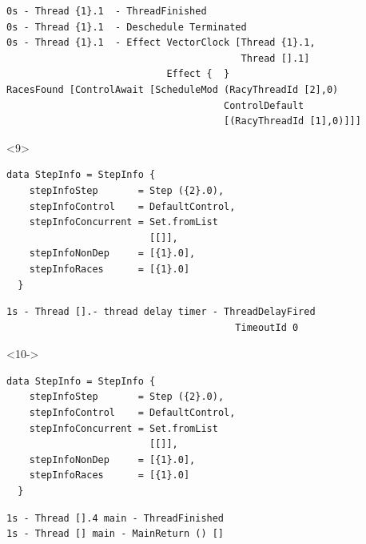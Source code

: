 \documentclass[t,x11names,xcolor={x11names},hyperref={colorlinks,citecolor=Blue4,linkcolor=Blue4,anchorcolor=Blue4,urlcolor=Blue4}]{beamer}
\begin{document}
\begin{frame}[fragile]
\begin{columns}
\begin{column}{0.6\textwidth}
\begin{onlyenv}
\begin{verbatim}
        \end{verbatim}
        \begin{verbatim}
0s - Thread {1}.1  - ThreadFinished
0s - Thread {1}.1  - Deschedule Terminated
0s - Thread {1}.1  - Effect VectorClock [Thread {1}.1,
                                         Thread [].1]
                            Effect {  }
RacesFound [ControlAwait [ScheduleMod (RacyThreadId [2],0)
                                      ControlDefault
                                      [(RacyThreadId [1],0)]]]
        \end{verbatim}
      \end{onlyenv}
      \begin{onlyenv}<9>
        \tiny
        \begin{verbatim}
data StepInfo = StepInfo {
    stepInfoStep       = Step ({2}.0),
    stepInfoControl    = DefaultControl,
    stepInfoConcurrent = Set.fromList
                         [[]],
    stepInfoNonDep     = [{1}.0],
    stepInfoRaces      = [{1}.0]
  }

        \end{verbatim}
        \begin{verbatim}
1s - Thread [].- thread delay timer - ThreadDelayFired
                                        TimeoutId 0
        \end{verbatim}
      \end{onlyenv}
      \begin{onlyenv}<10->
        \tiny
        \begin{verbatim}
data StepInfo = StepInfo {
    stepInfoStep       = Step ({2}.0),
    stepInfoControl    = DefaultControl,
    stepInfoConcurrent = Set.fromList
                         [[]],
    stepInfoNonDep     = [{1}.0],
    stepInfoRaces      = [{1}.0]
  }

        \end{verbatim}
        \begin{verbatim}
1s - Thread [].4 main - ThreadFinished
1s - Thread [] main - MainReturn () []
        \end{verbatim}
      \end{onlyenv}
    \end{column}
  \end{columns}
\end{frame}
\end{document}
